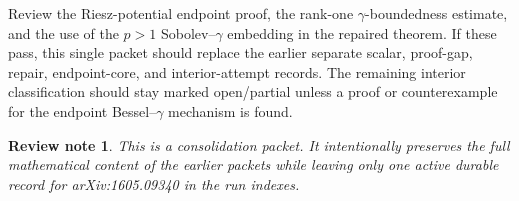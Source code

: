 \documentclass[11pt]{article}
\newtheorem*{reviewnote}{Review note}
\begin{document}
Review the Riesz-potential endpoint proof, the rank-one \(\gamma\)-boundedness estimate, and the use of the \(p>1\) Sobolev--\(\gamma\) embedding in the repaired theorem.  If these pass, this single packet should replace the earlier separate scalar, proof-gap, repair, endpoint-core, and interior-attempt records.  The remaining interior classification should stay marked open/partial unless a proof or counterexample for the endpoint Bessel--\(\gamma\) mechanism is found.

\begin{reviewnote}
This is a consolidation packet.  It intentionally preserves the full mathematical content of the earlier packets while leaving only one active durable record for arXiv:1605.09340 in the run indexes.
\end{reviewnote}
\end{document}
